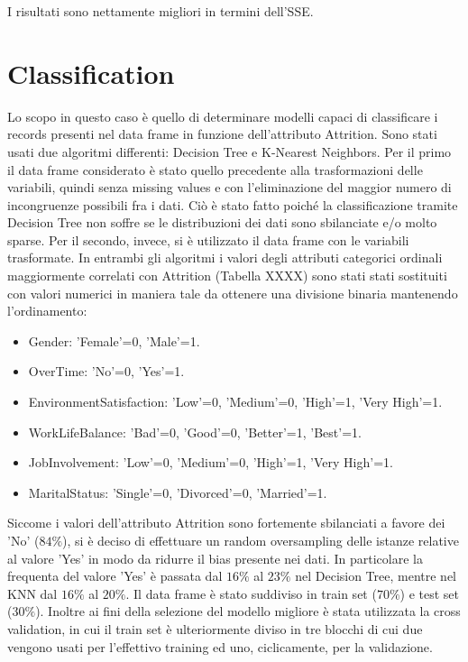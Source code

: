 \documentclass[a4paper,9pt]{article}
\begin{document}
I risultati sono nettamente migliori in termini dell'SSE.

\section{Classification}
Lo scopo in questo caso è quello di determinare modelli capaci di classificare i records presenti nel data frame in funzione dell'attributo Attrition. Sono stati usati due algoritmi differenti: Decision Tree e K-Nearest Neighbors. Per il primo il data frame considerato è stato quello precedente alla trasformazioni delle variabili, quindi senza missing values e con l'eliminazione del maggior numero di incongruenze possibili fra i dati. Ciò è stato fatto poiché la classificazione tramite Decision Tree non soffre se le distribuzioni dei dati sono sbilanciate e/o molto sparse. Per il secondo, invece, si è utilizzato il data frame con le variabili trasformate. 
In entrambi gli algoritmi i valori degli attributi categorici ordinali maggiormente correlati con Attrition (Tabella XXXX) sono stati stati sostituiti con valori numerici in maniera tale da ottenere una divisione binaria mantenendo l'ordinamento:

\begin{itemize}
\item Gender: 'Female'=0, 'Male'=1.
\item OverTime: 'No'=0, 'Yes'=1.
\item EnvironmentSatisfaction: 'Low'=0, 'Medium'=0, 'High'=1, 'Very High'=1.
\item WorkLifeBalance: 'Bad'=0, 'Good'=0, 'Better'=1, 'Best'=1.
\item JobInvolvement: 'Low'=0, 'Medium'=0, 'High'=1, 'Very High'=1.
\item MaritalStatus: 'Single'=0, 'Divorced'=0, 'Married'=1.
\end{itemize}

Siccome i valori dell'attributo Attrition sono fortemente sbilanciati a favore dei 'No' ($84\%$), si è deciso di effettuare un  random oversampling delle istanze relative al valore 'Yes' in modo da ridurre il bias presente nei dati. In particolare la frequenta del valore 'Yes' è passata dal $16\%$ al $23\%$ nel Decision Tree, mentre nel KNN dal $16\%$ al $20\%$.
Il data frame è stato suddiviso in train set ($70\%$) e test set ($30\%$). Inoltre ai fini della selezione del modello migliore è stata utilizzata la cross validation, in cui il train set è ulteriormente diviso in tre blocchi di cui due vengono usati per l'effettivo training ed uno, ciclicamente, per la validazione.
\end{document}
